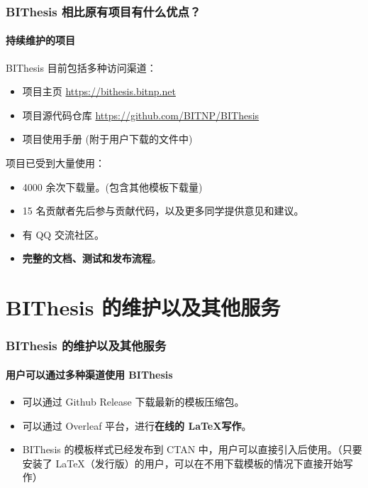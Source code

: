 \documentclass[
  aspectratio=169,
  presentation,
  titlegraphic=./images/bit.png,
  framelogo=./images/bit.png
]{bitbeamer}
\begin{document}
\begin{frame}[t]
  \frametitle{BIThesis 相比原有项目有什么优点？}
  \framesubtitle{持续维护的项目}

  BIThesis 目前包括多种访问渠道：
  \begin{itemize}
    \item 项目主页 \url{https://bithesis.bitnp.net}
    \item 项目源代码仓库 \url{https://github.com/BITNP/BIThesis}
    \item 项目使用手册 (附于用户下载的文件中)
  \end{itemize}

  \vspace{0.5cm}
  
  项目已受到大量使用：
  \begin{itemize}
    \item 4000 余次下载量。(包含其他模板下载量)
    \item 15 名贡献者先后参与贡献代码，以及更多同学提供意见和建议。
    \item 有 QQ 交流社区。
    \item \textbf{完整的文档、测试和发布流程}。
  \end{itemize}
\end{frame}

\section{BIThesis 的维护以及其他服务}

\begin{frame}[t]
  \frametitle{BIThesis 的维护以及其他服务}
  \framesubtitle{用户可以通过\textbf{多种渠道}使用 BIThesis}

\begin{itemize}
  \item 可以通过 Github Release 下载最新的模板压缩包。
  \item 可以通过 Overleaf 平台，进行\textbf{在线的 \LaTeX 写作}。
  \item BIThesis 的模板样式已经发布到 CTAN 中，用户可以直接引入后使用。（只要安装了 \LaTeX （发行版）的用户，可以在不用下载模板的情况下直接开始写作）
\end{itemize}
\end{frame}
\end{document}
